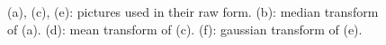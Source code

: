 \documentclass[a4paper]{article}
\begin{document}
\begin{figure}[!htb]
  \quad
  \caption{(a), (c), (e): pictures used in their raw form. (b): median transform of (a). (d): mean transform of (c). (f): gaussian transform of (e).}
  \label{fig:ex_one}
\end{figure}
\end{document}
